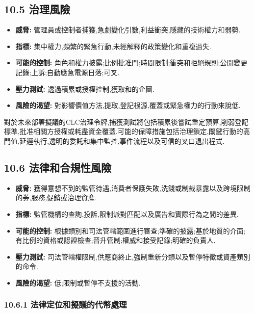 \documentclass[11pt]{article}
\begin{document}
\subsection*{10.5 治理風險}

\begin{itemize}[leftmargin=*]
\item \textbf{威脅:} 管理員或控制者捕獲,急劇變化引數,利益衝突,隱藏的技術權力和弱勢.
\item \textbf{指標:} 集中權力,頻繁的緊急行動,未經解釋的政策變化和重複過失.
\item \textbf{可能的控制:} 角色和權力披露;比例批准門;時間限制;衝突和拒絕規則;公開變更記錄;上訴;自動應急電源日落;可叉.
\item \textbf{壓力測試:} 透過積累或授權控制,獲取和的企圖.
\item \textbf{風險的渴望:} 對影響價值方法,提取,登記根源,覆蓋或緊急權力的行動來說低.
\end{itemize}
對於未來部署擬議的CLC治理令牌,捕獲測試將包括積累後嘗試重定預算,削弱登記標準,批准相關方授權或耗盡資金覆蓋.可能的保障措施包括治理鎖定,關鍵行動的高門值,延遲執行,透明的委託和集中監控,事件流程以及可信的叉口退出程式.

\subsection*{10.6 法律和合規性風險}

\begin{itemize}[leftmargin=*]
\item \textbf{威脅:} 獲得意想不到的監管待遇,消費者保護失敗,洗錢或制裁暴露以及跨境限制的券,服務,促銷或治理資產.
\item \textbf{指標:} 監管機構的查詢,投訴,限制派對匹配以及廣告和實際行為之間的差異.
\item \textbf{可能的控制:} 根據類別和司法管轄範圍進行審查;準確的披露;基於地質的介面;有比例的資格或認證檢查;晉升管制;權威和接受記錄;明確的負責人.
\item \textbf{壓力測試:} 司法管轄權限制,供應商終止,強制重新分類以及暫停特徵或資產類別的命令.
\item \textbf{風險的渴望:} 低;限制或暫停不支援的活動.
\end{itemize}
\subsubsection*{10.6.1 法律定位和擬議的代幣處理}
\end{document}
